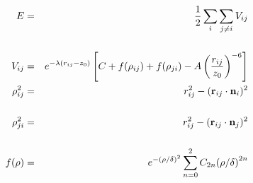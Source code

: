 \documentclass[aps,pr,onecolumn,superscriptaddress,noshowpacs,a4paper,15pt]{revtex4}
\begin{document}
\begingroup
\Large
\begin{eqnarray*}
  E & = & \frac{1}{2} \sum_i \sum_{j \neq i} V_{ij} \\[15pt]
  V_{ij} & = & e^{-\lambda (r_{ij} -z_0)} \left [ C + f(\rho_{ij}) + f(\rho_{ji}) - A \left ( \frac{r_{ij}}{z_0}\right )^{-6} \right ] \\
  \rho_{ij}^2 & = & r_{ij}^2 - ({\bf r}_{ij}\cdot {\bf n}_{i})^2 \\[15pt]
  \rho_{ji}^2 & = & r_{ij}^2 - ({\bf r}_{ij}\cdot  {\bf n}_{j})^2 \\[15pt]
  f(\rho) & = &  e^{-(\rho/\delta)^2} \sum_{n=0}^2 C_{2n} { (\rho/\delta) }^{2n}
\end{eqnarray*}
\endgroup
\end{document}

